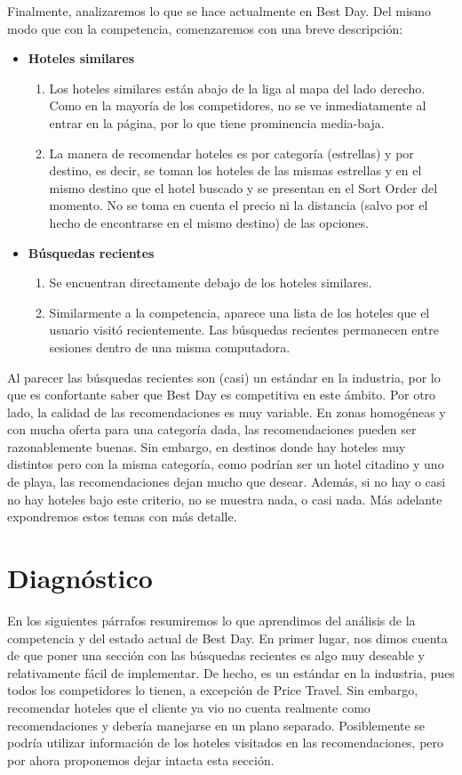 \documentclass[12pt]{report}
\begin{document}
Finalmente, analizaremos lo que se hace actualmente en Best Day. Del mismo modo que con la competencia, comenzaremos con una breve descripción:
\begin{itemize}
	\item \textbf{Hoteles similares}
	\begin{enumerate}
		\item Los hoteles similares están abajo de la liga al mapa del lado derecho. Como en la mayoría de los competidores, no se ve inmediatamente al entrar en la página, por lo que tiene prominencia media-baja.
		\item La manera de recomendar hoteles es por categoría (estrellas) y por destino, es decir, se toman los hoteles de las mismas estrellas y en el mismo destino que el hotel buscado y se presentan en el Sort Order del momento. No se toma en cuenta el precio ni la distancia (salvo por el hecho de encontrarse en el mismo destino) de las opciones.
	\end{enumerate}
	\item \textbf{Búsquedas recientes}
	\begin{enumerate}
		\item Se encuentran directamente debajo de los hoteles similares.
		\item Similarmente a la competencia, aparece una lista de los hoteles que el usuario visitó recientemente. Las búsquedas recientes permanecen entre sesiones dentro de una misma computadora.
	\end{enumerate}
\end{itemize}
Al parecer las búsquedas recientes son (casi) un estándar en la industria, por lo que es confortante saber que Best Day es competitiva en este ámbito. Por otro lado, la calidad de las recomendaciones es muy variable. En zonas homogéneas y con mucha oferta para una categoría dada, las recomendaciones pueden ser razonablemente buenas. Sin embargo, en destinos donde hay hoteles muy distintos pero con la misma categoría, como podrían ser un hotel citadino y uno de playa, las recomendaciones dejan mucho que desear. Además, si no hay o casi no hay hoteles bajo este criterio, no se muestra nada, o casi nada. Más adelante expondremos estos temas con más detalle.

\section{Diagnóstico}

En los siguientes párrafos resumiremos lo que aprendimos del análisis de la competencia y del estado actual de Best Day. En primer lugar, nos dimos cuenta de que poner una sección con las búsquedas recientes es algo muy deseable y relativamente fácil de implementar. De hecho, es un estándar en la industria, pues todos los competidores lo tienen, a excepción de Price Travel. Sin embargo, recomendar hoteles que el cliente ya vio no cuenta realmente como recomendaciones y debería manejarse en un plano separado. Posiblemente se podría utilizar información de los hoteles visitados en las recomendaciones, pero por ahora proponemos dejar intacta esta sección.
\end{document}
